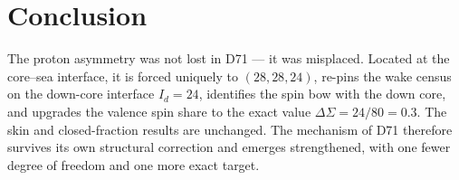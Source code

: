 \documentclass[11pt,a4paper]{article}
\begin{document}
\section{Conclusion}
The proton asymmetry was not lost in D71 --- it was misplaced. Located at the core--sea interface, it is forced uniquely to $(28,28,24)$, re-pins the wake census on the down-core interface $I_d = 24$, identifies the spin bow with the down core, and upgrades the valence spin share to the exact value $\Delta\Sigma = 24/80 = 0.3$. The skin and closed-fraction results are unchanged. The mechanism of D71 therefore survives its own structural correction and emerges strengthened, with one fewer degree of freedom and one more exact target.
\end{document}
